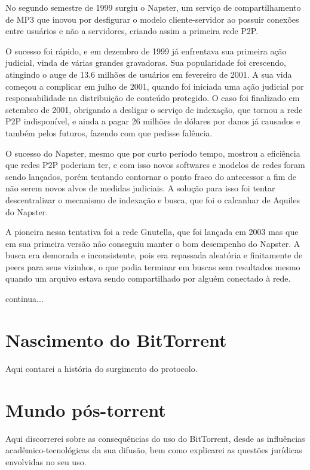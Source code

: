 No segundo semestre de 1999 surgiu o Napster, um serviço de compartilhamento de MP3 que inovou por desfigurar o modelo cliente-servidor ao possuir conexões entre usuários e não a servidores, criando assim a primeira rede P2P.

O sucesso foi rápido, e em dezembro de 1999 já enfrentava sua primeira ação judicial, vinda de várias grandes gravadoras. Sua popularidade foi crescendo, atingindo o auge de 13.6 milhões de usuários em fevereiro de 2001. A sua vida começou a complicar em julho de 2001, quando foi iniciada uma ação judicial por responsabilidade na distribuição de conteúdo protegido. O caso foi finalizado em setembro de 2001, obrigando a desligar o serviço de indexação, que tornou a rede P2P indisponível, e ainda a pagar 26 milhões de dólares por danos já causados e também pelos futuros, fazendo com que pedisse falência.

O sucesso do Napster, mesmo que por curto período tempo, mostrou a eficiência que redes P2P poderiam ter, e com isso novos softwares e modelos de redes foram sendo lançados, porém tentando contornar o ponto fraco do antecessor a fim de não serem novos alvos de medidas judiciais. A solução para isso foi tentar descentralizar o mecanismo de indexação e busca, que foi o calcanhar de Aquiles do Napster.

A pioneira nessa tentativa foi a rede Gnutella, que foi lançada em 2003 mas que em sua primeira versão não conseguiu manter o bom desempenho do Napster. A busca era demorada e inconsistente, pois era repassada aleatória e finitamente de peers para seus vizinhos, o que podia terminar em buscas sem resultados mesmo quando um arquivo estava sendo compartilhado por alguém conectado à rede.

continua...

\section{Nascimento do BitTorrent}

Aqui contarei a história do surgimento do protocolo.

\section{Mundo pós-torrent}

Aqui discorrerei sobre as consequências do uso do BitTorrent, desde as influências acadêmico-tecnológicas da sua difusão, bem como explicarei as questões jurídicas envolvidas no seu uso.

\clearpage
